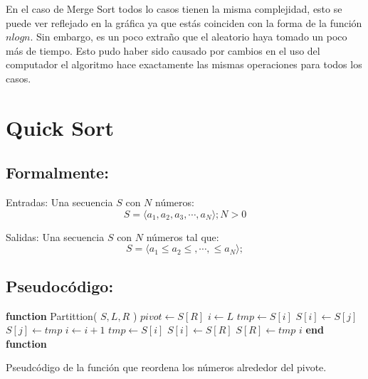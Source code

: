 \documentclass[12pt,spanish]{article}
\theoremstyle{definition}
\begin{document}
En el caso de Merge Sort todos lo casos tienen la misma complejidad, esto se puede ver reflejado en la gráfica ya que estás coinciden con la forma de la función $nlogn$. Sin embargo,  es un poco extraño que el aleatorio haya tomado un poco más de tiempo. Esto pudo haber sido causado por cambios en el uso del computador el algoritmo hace exactamente las mismas operaciones para todos los casos.

\section{Quick Sort}{}

\subsection{Formalmente:}{}
Entradas: Una secuencia $S$ con $N$ números:
\begin{equation}
    S =  \left.\langle a_{1}, a_{2}, a_{3}, \cdots, a_{N} \rangle\right.;
    N > 0
\end{equation}

Salidas: Una secuencia $S$ con $N$ números tal que:
\begin{equation}
     S =  \left.\langle  a_{1} \le a_{2} \le, \cdots, \le a_{N} \rangle\right.;
\end{equation}


\subsection{Pseudocódigo:}{}

\begin{algorithm}
\begin{algorithmic}[1]
\STATE \textbf{function} Partittion( $S, L, R$ ) 
\STATE $pivot \leftarrow S[R]$
\STATE $i \leftarrow L$
        \STATE $tmp \leftarrow S[i]$
        \STATE $S[i] \leftarrow S[j]$ 
        \STATE $S[j] \leftarrow tmp$
        \STATE $i \leftarrow i +1$
    \ENDIF
    \STATE $tmp \leftarrow S[i]$
    \STATE $S[i] \leftarrow S[R]$ 
    \STATE $S[R] \leftarrow tmp$
\ENDFOR
\RETURN $i$
\STATE \textbf{end function}
\caption{Pseudcódigo de la función que reordena los números alrededor del pivote.}
\end{algorithmic}
\end{algorithm}
\end{document}
